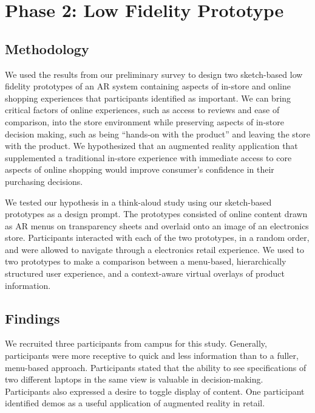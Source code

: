 \section{Phase 2: Low Fidelity Prototype}
\subsection{Methodology}
We used the results from our preliminary survey to design two sketch-based low fidelity prototypes of an AR system containing aspects of in-store and online shopping experiences that participants identified as important.  We can bring critical factors of online experiences, such as access to reviews and ease of comparison, into the store environment while preserving aspects of in-store decision making, such as being ``hands-on with the product'' and leaving the store with the product. We hypothesized that an augmented reality application that supplemented a traditional in-store experience with immediate access to core aspects of online shopping would improve consumer's confidence in their purchasing decisions. 

We tested our hypothesis in a think-aloud study using our sketch-based prototypes as a design prompt.  The prototypes consisted of online content drawn as AR menus on transparency sheets and overlaid onto an image of an electronics store. Participants interacted with each of the two prototypes, in a random order, and were allowed to navigate through a electronics retail experience. We used to two prototypes to make a comparison between a menu-based, hierarchically structured user experience, and a context-aware virtual overlays of product information.  


\subsection{Findings}
We recruited three participants from campus for this study. Generally, participants were more receptive to quick and less information than to a fuller, menu-based approach. Participants stated that the ability to see specifications of two different laptops in the same view is valuable in decision-making. Participants also expressed a desire to toggle display of content. One participant identified demos as a useful application of augmented reality in retail.